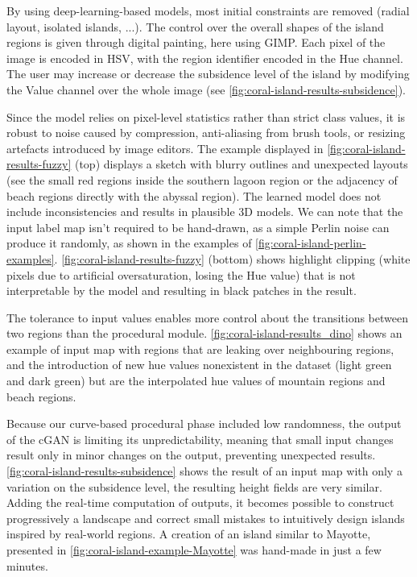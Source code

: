 By using deep-learning-based models, most initial constraints are removed (radial layout, isolated islands, ...). The control over the overall shapes of the island regions is given through digital painting, here using GIMP. Each pixel of the image is encoded in HSV, with the region identifier encoded in the Hue channel. The user may increase or decrease the subsidence level of the island by modifying the Value channel over the whole image (see \cref{fig:coral-island-results-subsidence}).

Since the model relies on pixel-level statistics rather than strict class values, it is robust to noise caused by compression, anti-aliasing from brush tools, or resizing artefacts introduced by image editors. The example displayed in \cref{fig:coral-island-results-fuzzy} (top) displays a sketch with blurry outlines and unexpected layouts (see the small red regions inside the southern lagoon region or the adjacency of beach regions directly with the abyssal region). The learned model does not include inconsistencies and results in plausible 3D models. We can note that the input label map isn't required to be hand-drawn, as a simple Perlin noise can produce it randomly, as shown in the examples of \cref{fig:coral-island-perlin-examples}. \cref{fig:coral-island-results-fuzzy} (bottom) shows highlight clipping (white pixels due to artificial oversaturation, losing the Hue value) that is not interpretable by the model and resulting in black patches in the result. 

The tolerance to input values enables more control about the transitions between two regions than the procedural module. \cref{fig:coral-island-results_dino} shows an example of input map with regions that are leaking over neighbouring regions, and the introduction of new hue values nonexistent in the dataset (light green and dark green) but are the interpolated hue values of mountain regions and beach regions.

Because our curve-based procedural phase included low randomness, the output of the cGAN is limiting its unpredictability, meaning that small input changes result only in minor changes on the output, preventing unexpected results. \cref{fig:coral-island-results-subsidence} shows the result of an input map with only a variation on the subsidence level, the resulting height fields are very similar. Adding the real-time computation of outputs, it becomes possible to construct progressively a landscape and correct small mistakes to intuitively design islands inspired by real-world regions. A creation of an island similar to Mayotte, presented in \cref{fig:coral-island-example-Mayotte} was hand-made in just a few minutes.

